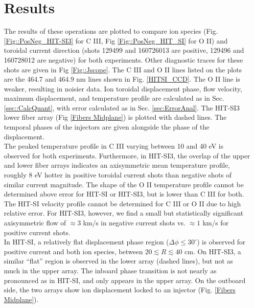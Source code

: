 \section{Results}
\hspace{4ex}The results of these operations are plotted to compare ion species (Fig.\ref{Fig::PosNeg_HIT-SI3} for C III,  Fig \ref{Fig::PosNeg_HIT_SI} for O II) and toroidal current direction (shots 129499 and 160726013 are positive, 129496 and 160728012 are negative) for both experiments. Other diagnostic traces for these shots are given in Fig \ref{Fig::Jscope}. The C III and O II lines listed on the plots are the 464.7 and 464.9 nm lines shown in Fig. \ref{HITSI_CCD}. The O II line is weaker, resulting in noisier data. Ion toroidal displacement phase, flow velocity, maximum displacement, and temperature profile are calculated as in Sec. \ref{sec::CalcQuant}, with error calculated as in Sec. \ref{sec:ErrorAnal}. The HIT-SI3 lower fiber array (Fig \ref{Fibers Midplane}) is plotted with dashed lines. The temporal phases of the injectors are given alongside the phase of the displacement.\\
\hspace*{4ex}The peaked temperature profile in C III varying between 10 and 40 eV  is observed for both experiments. Furthermore, in HIT-SI3, the overlap of the upper and lower fiber arrays indicates an axisymmetric mean temperature profile, roughly 8 eV hotter in positive toroidal current shots than negative shots of similar current magnitude. The shape of the O II temperature profile cannot be determined above error for HIT-SI or HIT-SI3, but is lower than C III for both.\\
\hspace*{4ex}The HIT-SI velocity profile cannot be determined for C III or O II due to high relative error. For HIT-SI3, however, we find a small but statistically significant axisymmetric flow of $\approx3$ km/s in negative current shots vs. $\approx1$ km/s for  positive current shots.\\
\hspace*{4ex}In HIT-SI, a relatively flat displacement phase region ($\Delta\phi\leq30^\circ$) is observed for positive current and both ion species, between $20\lesssim{R}\lesssim40$ cm. On HIT-SI3, a similar ``flat'' region is observed in the lower array (dashed lines), but not as much in the upper array. The inboard phase transition is not nearly as pronounced as in HIT-SI, and only appears in the upper array. On the outboard side, the two arrays show ion displacement locked to an injector (Fig. \ref{Fibers Midplane}).

